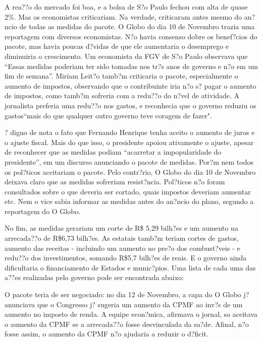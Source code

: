 \documentclass{article}
\begin{document}
A rea??o do mercado foi boa, e a bolsa de S?o Paulo fechou com alta de quase 2\%. Mas os economistas criticariam. Na verdade, criticaram antes mesmo do an?ncio de todas as medidas do pacote. O Globo do dia 10 de Novembro trazia uma reportagem com diversos economistas. N?o havia consenso dobre os benef?cios do pacote, mas havia poucas d?vidas de que ele aumentaria o desemprego e diminuiria o crescimento. Um economista da FGV de S?o Paulo observava que ``Essas medidas poderiam ter sido tomadas nos tr?s anos de governo e n?o em um fim de semana''. Miriam Leit?o tamb?m criticaria o pacote, especialmente o aumento de impostos, observando que o contribuinte iria n?o s? pagar o aumento de impostos, como tamb?m sofreria com a redu??o do n?vel de atividade. A jornalista preferia uma redu??o nos gastos, e reconhecia que o governo reduziu os gastos``mais do que qualquer outro governo teve coragem de fazer". 

? digno de nota o fato que Fernando Henrique tenha aceito o aumento de juros e o ajuste fiscal. Mais do que isso, o presidente apoiou ativamente o ajuste, apesar de reconhecer que as medidas podiam ``acarretar a impopularidade do presidente'', em um discurso anunciando o pacote de medidas. Por?m nem todos os pol?ticos aceitariam o pacote. Pelo contr?rio, O Globo do dia 10 de Novembro deixava claro que as medidas sofreriam resist?ncia. Pol?ticos n?o foram consultados sobre o que deveria ser cortado, quais impostos deveriam aumentar etc. Nem o vice sabia informar as medidas antes do an?ncio do plano, segundo a reportagem do O Globo. 

No fim, as medidas gerariam um corte de R\$ 5,29 bilh?es e um aumento na arrecada??o de R\$6,73 bilh?es. As estatais tamb?m teriam cortes de gastos, aumento das receitas - incluindo um aumento no pre?o dos combust?veis - e redu??o dos investimentos, somando R\$5,7 bilh?es de reais. E o governo ainda dificultaria o financiamento de Estados e munic?pios. Uma lista de cada uma das a??es realizadas pelo governo pode ser encontrada abaixo:

%

O pacote teria de ser negociado: no dia 12 de Novembro, a capa do O Globo j? anunciava que o Congresso j? sugeria um aumento da CPMF ao inv?s de um aumento no imposto de renda. A equipe econ?mica, afirmava o jornal, so aceitava o aumento da CPMF se a arrecada??o fosse desvinculada da sa?de. Afinal, n?o fosse assim, o aumento da CPMF n?o ajudaria a reduzir o d?ficit. 
\end{document}
